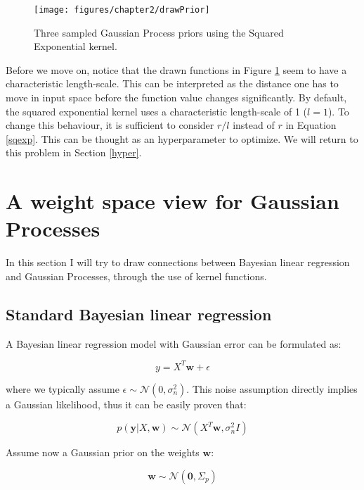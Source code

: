 \documentclass[10pt,a4paper,twoside]{book}
\begin{document}
\begin{figure}
\caption{Three sampled Gaussian Process priors using the Squared Exponential kernel.}
\label{fig:drawPrior}
\texttt{[image: figures/chapter2/drawPrior]}
\end{figure}

Before we move on, notice that the drawn functions in Figure \ref{fig:drawPrior} seem to have a characteristic length-scale. This can be interpreted as the distance one has to move in input space before the function value changes significantly. By default, the squared exponential kernel uses a characteristic length-scale of 1 ($l = 1$). To change this behaviour, it is sufficient to consider $r/l$ instead of $r$ in Equation \ref{sqexp}. This can be thought as an hyperparameter to optimize. We will return to this problem in Section \ref{hyper}.

\section{A weight space view for Gaussian Processes}

In this section I will try to draw connections between Bayesian linear regression \cite{Bolstad2007} and  Gaussian Processes, through the use of kernel functions. 

\subsection{Standard Bayesian linear regression}

A Bayesian linear regression model with Gaussian error can be formulated as:

\begin{equation}
\label{linearmodel}
y = X^T \boldsymbol{w} + \epsilon
\end{equation} 

where we typically assume $\epsilon \sim \mathcal{N}(0, \sigma_n^2)$. This noise assumption directly implies a Gaussian likelihood, thus it can be easily proven that:

\begin{equation}
p(\boldsymbol{y}|X, \boldsymbol{w}) \sim \mathcal{N} (X^T\boldsymbol{w}, \sigma_n^2 I)
\end{equation}

Assume now a Gaussian prior on the weights $\boldsymbol{w}$:

\begin{equation}
\label{wprior}
\boldsymbol{w} \sim \mathcal{N}(\boldsymbol{0}, \Sigma_p)
\end{equation}
\end{document}
